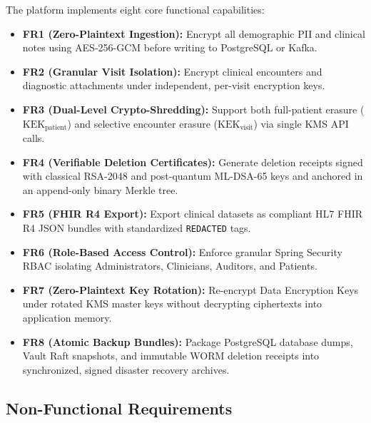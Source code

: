 The platform implements eight core functional capabilities:
\begin{itemize}
    \item \textbf{FR1 (Zero-Plaintext Ingestion):} Encrypt all demographic PII and clinical notes using AES-256-GCM before writing to PostgreSQL or Kafka.
    \item \textbf{FR2 (Granular Visit Isolation):} Encrypt clinical encounters and diagnostic attachments under independent, per-visit encryption keys.
    \item \textbf{FR3 (Dual-Level Crypto-Shredding):} Support both full-patient erasure ($\text{KEK}_{\text{patient}}$) and selective encounter erasure ($\text{KEK}_{\text{visit}}$) via single KMS API calls.
    \item \textbf{FR4 (Verifiable Deletion Certificates):} Generate deletion receipts signed with classical RSA-2048 and post-quantum ML-DSA-65 keys and anchored in an append-only binary Merkle tree.
    \item \textbf{FR5 (FHIR R4 Export):} Export clinical datasets as compliant HL7 FHIR R4 JSON bundles with standardized \texttt{REDACTED} tags.
    \item \textbf{FR6 (Role-Based Access Control):} Enforce granular Spring Security RBAC isolating Administrators, Clinicians, Auditors, and Patients.
    \item \textbf{FR7 (Zero-Plaintext Key Rotation):} Re-encrypt Data Encryption Keys under rotated KMS master keys without decrypting ciphertexts into application memory.
    \item \textbf{FR8 (Atomic Backup Bundles):} Package PostgreSQL database dumps, Vault Raft snapshots, and immutable WORM deletion receipts into synchronized, signed disaster recovery archives.
\end{itemize}

\subsection{Non-Functional Requirements}

